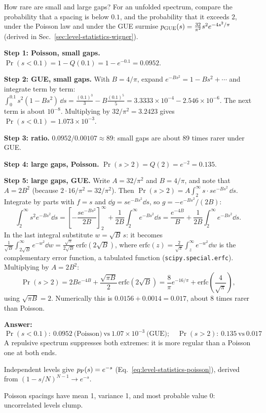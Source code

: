 \begin{sample}{How rare are small and large gaps?}
For an unfolded spectrum, compare the probability that a spacing is below $0.1$, and the probability that it exceeds $2$, under the Poisson law and under the GUE surmise $p_{\rm GUE}(s)=\frac{32}{\pi^2}s^2e^{-4s^2/\pi}$ (derived in Sec.~\ref{sec:level-statistics-wigner}).

\textbf{Step 1: Poisson, small gaps.} $\Pr(s<0.1)=1-Q(0.1)=1-e^{-0.1}=0.0952$.

\textbf{Step 2: GUE, small gaps.} With $B=4/\pi$, expand $e^{-Bs^2}=1-Bs^2+\cdots$ and integrate term by term:
$\int_0^{0.1}s^2(1-Bs^2)\,\dd s=\frac{(0.1)^3}{3}-B\frac{(0.1)^5}{5}=3.3333\times10^{-4}-2.546\times10^{-6}$. The next term is about $10^{-8}$. Multiplying by $32/\pi^2=3.2423$ gives $\Pr(s<0.1)=1.073\times10^{-3}$.

\textbf{Step 3: ratio.} $0.0952/0.00107\approx89$: small gaps are about 89 times rarer under GUE.

\textbf{Step 4: large gaps, Poisson.} $\Pr(s>2)=Q(2)=e^{-2}=0.135$.

\textbf{Step 5: large gaps, GUE.} Write $A=32/\pi^2$ and $B=4/\pi$, and note that $A=2B^2$ (because $2\cdot16/\pi^2=32/\pi^2$). Then $\Pr(s>2)=A\int_2^\infty s\cdot se^{-Bs^2}\,\dd s$. Integrate by parts with $f=s$ and $\dd g=se^{-Bs^2}\dd s$, so $g=-e^{-Bs^2}/(2B)$:
\[
\int_2^\infty s^2e^{-Bs^2}\dd s=\left[-\frac{se^{-Bs^2}}{2B}\right]_2^\infty+\frac{1}{2B}\int_2^\infty e^{-Bs^2}\dd s=\frac{e^{-4B}}{B}+\frac{1}{2B}\int_2^\infty e^{-Bs^2}\dd s .
\]
In the last integral substitute $w=\sqrt B\,s$: it becomes $\frac{1}{\sqrt B}\int_{2\sqrt B}^\infty e^{-w^2}\dd w=\frac{\sqrt\pi}{2\sqrt B}\,\mathrm{erfc}(2\sqrt B)$, where $\mathrm{erfc}(z)=\frac{2}{\sqrt\pi}\int_z^\infty e^{-w^2}\dd w$ is the complementary error function, a tabulated function (\texttt{scipy.special.erfc}). Multiplying by $A=2B^2$:
\[
\Pr(s>2)=2Be^{-4B}+\frac{\sqrt{\pi B}}{2}\,\mathrm{erfc}(2\sqrt B)=\frac{8}{\pi}e^{-16/\pi}+\mathrm{erfc}\!\left(\frac{4}{\sqrt\pi}\right),
\]
using $\sqrt{\pi B}=2$. Numerically this is $0.0156+0.0014=0.017$, about 8 times rarer than Poisson.

\textbf{Answer:}
\[\boxed{\Pr(s<0.1):\ 0.0952\ \text{(Poisson)}\ \text{vs}\ 1.07\times10^{-3}\ \text{(GUE)};\quad \Pr(s>2):\ 0.135\ \text{vs}\ 0.017}\]
A repulsive spectrum suppresses both extremes: it is more regular than a Poisson one at both ends.
\end{sample}

\begin{keyideas}
\item Independent levels give $p_{\rm P}(s)=e^{-s}$ (Eq.~\eqref{eq:level-statistics-poisson}), derived from $(1-s/N)^{N-1}\to e^{-s}$.
\item Poisson spacings have mean 1, variance 1, and most probable value 0: uncorrelated levels clump.
\end{keyideas}

